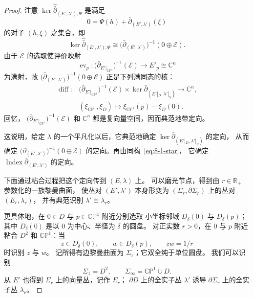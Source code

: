 \begin{proof}
注意 $\ker\widehat{\bar\partial}_{(E',\lambda');\Psi}$ 是满足
\[
0=\Psi(h)+\bar\partial_{(E',\lambda')}(\xi)
\]
的对子 $(h,\xi)$ 之集合，即
\[
\ker\widehat{\bar\partial}_{(E',\lambda');\Psi}
\cong\bigl(\bar\partial_{(E',\lambda')}\bigr)^{-1}
(0\oplus\mathcal E).
\]
由于 $\mathcal E$ 的选取使评价映射
\[
\operatorname{ev}_p\colon
\bigl(\bar\partial_{E'|_{\mathbb{CP}^1}}\bigr)^{-1}(\mathcal E)
\longrightarrow E'_p\cong\mathbb C^n
\]
为满射，故
$\bigl(\bar\partial_{(E',\lambda')}\bigr)^{-1}
(0\oplus\mathcal E)$ 正是下列满同态的核：
\[
\begin{split}
\operatorname{diff}\colon{}
&\bigl(\bar\partial_{E'|_{\mathbb{CP}^1}}\bigr)^{-1}(\mathcal E)
\times\ker\bar\partial_{(E'|_D,\lambda'|_S)}
\longrightarrow\mathbb C^n,\\
&(\xi_{\mathbb{CP}^1},\xi_D)
\longmapsto\xi_{\mathbb{CP}^1}(p)-\xi_D(0).
\end{split}
\]
回忆，
$\bigl(\bar\partial_{E'|_{\mathbb{CP}^1}}\bigr)^{-1}(\mathcal E)$
和 $\mathbb C^n$ 都是复向量空间，因而典范地带定向。

这说明，给定 $\lambda$ 的一个平凡化以后，它典范地确定
$\ker\bar\partial_{(E'|_D,\lambda'|_S)}$ 的定向，
从而确定
$\bigl(\bar\partial_{(E',\lambda')}\bigr)^{-1}
(0\oplus\mathcal E)$ 的定向。再由同构~\eqref{eq:8-1-star}，
它确定 $\operatorname{Index}\bar\partial_{(E',\lambda')}$ 的定向。

下面通过粘合过程把这个定向传到 $(E,\lambda)$ 上。
可以磨光节点，得到由 $r\in\mathbb R_+$ 参数化的一族黎曼曲面，
使丛对 $(E',\lambda')$ 本身形变为
$(\Sigma_r,\partial\Sigma_r)$ 上的丛对 $(E_r,\lambda_r)$，
并有典范识别 $\lambda'\cong\lambda_r$。

更具体地，在 $0\in D$ 与 $p\in\mathbb{CP}^1$ 附近分别选取
小坐标邻域 $D_\delta(0)$ 与 $D_\delta(p)$；其中
$D_\delta(0)$ 是以 $0$ 为中心、半径为 $\delta$ 的圆盘。
对正实数 $r>0$，在 $0$ 与 $p$ 附近粘合 $D^2$ 和
$\mathbb{CP}^1$：当
\[
z\in D_\delta(0),\qquad w\in D_\delta(p),\qquad zw=1/r
\]
时识别 $z$ 与 $w$。%
记所得有边黎曼曲面为 $\Sigma_r$；它双全纯于单位圆盘。
我们可以识别
\[
\Sigma_1=D^2,
\qquad
\Sigma_\infty=\mathbb{CP}^1\cup D.
\]
从 $E'$ 也得到 $\Sigma_r$ 上的向量丛，记作 $E_r$；
$\partial D$ 上的全实子丛 $\lambda'$ 诱导
$\partial\Sigma_r$ 上的全实子丛 $\lambda_r$。


\end{proof}
